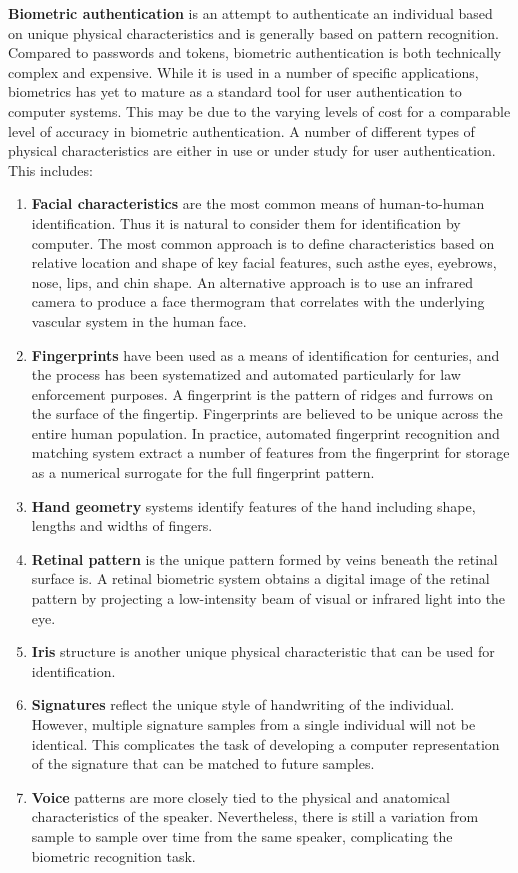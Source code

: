 \documentclass[11pt]{article}
\theoremstyle{plain} %
\theoremstyle{definition}
\theoremstyle{example}
\theoremstyle{remark}
\begin{document}
\textbf{Biometric authentication} is an attempt to authenticate an individual based on unique physical 
characteristics and is generally based on pattern recognition. Compared to passwords and tokens, biometric authentication is both technically complex and expensive. While it is used in a number of specific applications, biometrics has yet to mature as a standard tool for user authentication to computer systems. This may be due to the varying levels of cost for a comparable level of accuracy in biometric authentication. A number of different types of physical characteristics are either in use or under study for user authentication. This includes:
\begin{enumerate}
	\item \textbf{Facial characteristics} are the most common means
of human-to-human identification. Thus it is natural to consider them for
identification by computer. The most common approach is to define characteristics
based on relative location and shape of key facial features, such asthe
eyes, eyebrows, nose, lips, and chin shape. An alternative approach is to use an
infrared camera to produce a face thermogram that correlates with the underlying
vascular system in the human face.
	\item \textbf{Fingerprints} have been used as a means of identification for
centuries, and the process has been systematized and automated particularly
for law enforcement purposes. A fingerprint is the pattern of ridges and
furrows on the surface of the fingertip. Fingerprints are believed to be unique
across the entire human population. In practice, automated fingerprint recognition
and matching system extract a number of features from the fingerprint
for storage as a numerical surrogate for the full fingerprint pattern.
	\item \textbf{Hand geometry} systems identify features of the hand
including shape, lengths and widths of fingers.
	\item \textbf{Retinal pattern} is the unique pattern formed by veins beneath the retinal surface is. A retinal biometric system obtains a digital image of the retinal pattern by projecting a low-intensity beam of visual or infrared light into the eye.
	\item \textbf{Iris} structure is another unique physical characteristic that can be used for identification.
	\item \textbf{Signatures} reflect the unique style of handwriting of the individual. However, multiple signature samples from a single individual will not be identical. This complicates the task of developing a computer representation of the signature that can be matched to future samples.
	\item \textbf{Voice} patterns are more closely tied to the physical and anatomical characteristics of the speaker. Nevertheless, there is still a variation from sample to sample over
time from the same speaker, complicating the biometric recognition task.
\end{enumerate}
\end{document}
